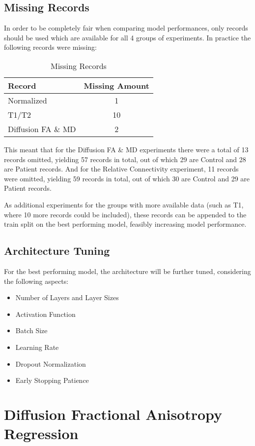\subsection{Missing Records}

In order to be completely fair when comparing model performances, only records should be used which are available for all 4 groups of experiments. In practice the following records were missing:
\begin{table}[H]
\centering
\begin{tabular}{|l|c|}
\hline
\textbf{Record} & \textbf{Missing Amount} \\ \hline
Normalized & 1 \\ \hline
T1/T2 & 10 \\ \hline
Diffusion \ac{FA} \& \ac{MD} & 2 \\ \hline
\end{tabular}
\caption{Missing Records}
\end{table}
This meant that for the Diffusion \ac{FA} \& \ac{MD} experiments there were a total of 13 records omitted, yielding 57 records in total, out of which 29 are Control and 28 are Patient records. And for the Relative Connectivity experiment, 11 records were omitted, yielding 59 records in total, out of which 30 are Control and 29 are Patient records.\par
As additional experiments for the groups with more available data (such as T1, where 10 more records could be included), these records can be appended to the train split on the best performing model, feasibly increasing model performance.

\subsection{Architecture Tuning}

For the best performing model, the architecture will be further tuned, considering the following aspects:
\begin{itemize}
  \item Number of Layers and Layer Sizes
  \item Activation Function
  \item Batch Size
  \item Learning Rate
  \item Dropout Normalization
  \item Early Stopping Patience
\end{itemize}

\section{Diffusion Fractional Anisotropy Regression}

